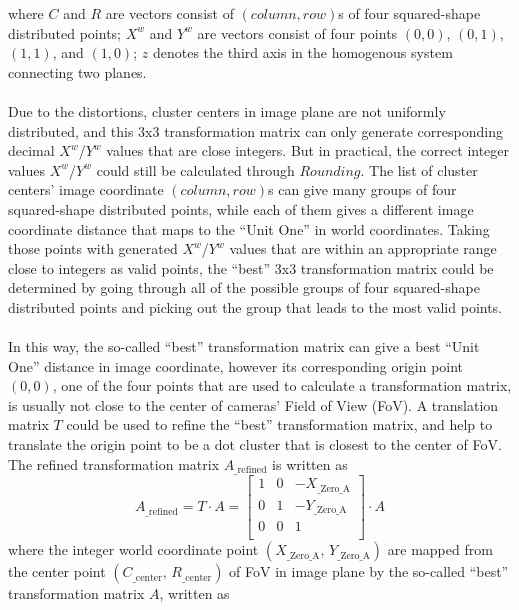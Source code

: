 %
where \(C\) and \(R\) are vectors consist of \((column, row)\)s of four squared-shape distributed points; \(X^w\) and \(Y^w\) are vectors consist of four points \((0, 0)\), \((0, 1)\), \((1, 1)\), and \((1, 0)\); \(z\) denotes the third axis in the homogenous system connecting two planes. %
\\\\%
Due to the distortions, cluster centers in image plane are not uniformly distributed, and this 3x3 transformation matrix can only generate corresponding decimal \(X^w\)/\(Y^w\) values that are close integers. But in practical, the correct integer values \(X^w\)/\(Y^w\) could still be calculated through \(Rounding\). The list of cluster centers' image coordinate \((column, row)\)s can give many groups of four squared-shape distributed points, while each of them gives a different image coordinate distance that maps to the \enquote{Unit One} in world coordinates. Taking those points with generated \(X^w\)/\(Y^w\) values that are within an appropriate range close to integers as valid points, the \enquote{best} 3x3 transformation matrix could be determined by going through all of the possible groups of four squared-shape distributed points and picking out the group that leads to the most valid points.%
\\\\%
In this way, the so-called \enquote{best} transformation matrix can give a best \enquote{Unit One} distance in image coordinate, however its corresponding origin point \((0, 0)\), one of the four points that are used to calculate a transformation matrix, is usually not close to the center of cameras' Field of View (FoV). A translation matrix \(T\) could be used to refine the \enquote{best} transformation matrix, and help to translate the origin point to be a dot cluster that is closest to the center of FoV. The refined transformation matrix \(A_{\text{\_refined}}\) is written as%
%
\begin{equation}
%
A_{\text{\_refined}}%
= %
T \cdot A %
= %
\begin{bmatrix} 
1 & 0 & -X_{\text{\_Zero\_A}} \\%
0 & 1 & -Y_{\text{\_Zero\_A}} \\%
0 & 0 &   1 \\%
\end{bmatrix}%
\cdot A%
%
\end{equation}%
%
where the integer world coordinate point \((X_{\text{\_Zero\_A}}, \, Y_{\text{\_Zero\_A}})\) are mapped from the center point \((C_{\text{\_center}}, \, R_{\text{\_center}})\) of FoV in image plane by the so-called \enquote{best} transformation matrix \(A\), written as%
